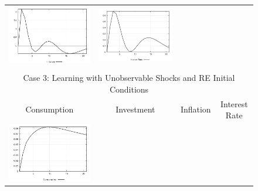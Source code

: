 \begin{figure}
\begin{tabular}{cccc}
\includegraphics[scale=0.22]{results_reallinit/Inflation_invshock_irf.png} & 
\includegraphics[scale=0.22]{results_reallinit/Interest_Rate_invshock_irf.png} \\ \\ 
\multicolumn{4}{c}{Case 3: Learning with Unobservable Shocks and RE Initial Conditions}\\
Consumption & Investment & Inflation & Interest Rate \\ 
\includegraphics[scale=0.22]{results_reinit/Consumption_invshock_irf.png} & 

\end{tabular}
\end{figure}
